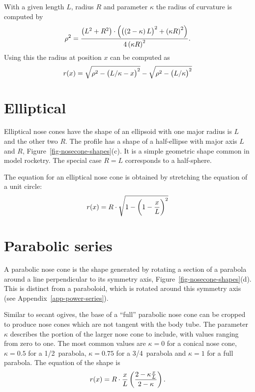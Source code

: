 With a given length $L$, radius $R$ and parameter $\kappa$ the radius
of curvature is computed by
%
\begin{equation}
\rho^2 = \frac{ \del{L^2+R^2}\cdot
  \del{ \del{\del{2-\kappa}L}^2 + \del{\kappa R}^2 }
}{ 4\del{\kappa R}^2 }.
\end{equation}
%
Using this the radius at position $x$ can be computed as
%
\begin{equation}
r(x) = \sqrt{\rho^2 - \del{L/\kappa - x}^2} - \sqrt{\rho^2-\del{L/\kappa}^2}
\end{equation}



\section{Elliptical}

Elliptical nose cones have the shape of an ellipsoid with one major
radius is $L$ and the other two $R$.  The profile has a shape of a
half-ellipse with major axis $L$ and $R$,
Figure~\ref{fig-nosecone-shapes}(c).  It is a simple geometric shape
common in model rocketry.  The special case $R=L$ corresponds to a
half-sphere.

The equation for an elliptical nose cone is obtained by stretching the
equation of a unit circle:
\begin{equation}
r(x) = R \cdot \sqrt{1-\del{1-\frac{x}{L}}^2}
\end{equation}


\section{Parabolic series}

A parabolic nose cone is the shape generated by rotating a section of
a parabola around a line perpendicular to its symmetry axis,
Figure~\ref{fig-nosecone-shapes}(d).  This is
distinct from a paraboloid, which is rotated around this symmetry
axis (see Appendix~\ref{app-power-series}).  

Similar to secant ogives, the base of a ``full'' parabolic nose cone
can be cropped to produce nose cones which are not tangent with the
body tube.  The parameter $\kappa$ describes the portion of the larger
nose cone to include, with values ranging from zero to one.  The most
common values are $\kappa=0$ for a conical nose cone, $\kappa=0.5$ for
a 1/2~parabola, $\kappa=0.75$ for a 3/4~parabola and $\kappa=1$ for a
full parabola.  The equation of the shape is
%
\begin{equation}
r(x) = R\cdot\frac{x}{L} \del{ \frac{2 - \kappa\frac{x}{L}}
   {2-\kappa}}.
\end{equation}



